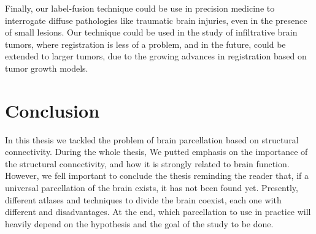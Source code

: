 Finally, our label-fusion technique could be use in precision medicine to
interrogate diffuse pathologies like traumatic brain injuries, even in the presence of small lesions.
Our technique could be used in the study of infiltrative brain tumors, where
registration is less of a problem, and in the future, could be extended to larger
tumors, due to the growing advances in registration based on tumor growth models. 

\section{Conclusion}
In this thesis we tackled the problem of brain parcellation based on structural
connectivity. During the whole thesis, We putted emphasis on the importance
of the structural connectivity, and how it is strongly related to brain function.
However, we fell important to conclude the thesis reminding the reader that,
if a universal parcellation of the brain exists, it has not been found yet.
Presently, different atlases and techniques to divide the brain coexist, each
one with different and disadvantages. At the end, which parcellation to use in
practice will heavily depend on the hypothesis and the goal of the study to be
done.


%
%
% 

%

